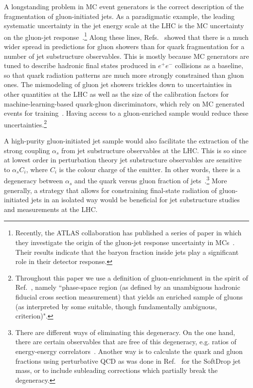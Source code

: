 \documentclass[a4paper,11pt]{article}
\begin{document}
A longstanding problem in MC event generators is the correct description of the fragmentation of gluon-initiated jets. As a paradigmatic example, the leading systematic uncertainty in the jet energy scale at the LHC is the MC uncertainty on the gluon-jet response~\cite{ATLAS:2020cli,CMS:2016lmd, CMS-DP-2020-019}.\footnote{Recently, the ATLAS collaboration has published a series of paper in which they investigate the origin of the gluon-jet response uncertainty in MCs~\cite{ATL-PHYS-PUB-2022-021,ATLAS:2024kkj, ATLAS:2024png}. Their results indicate that the baryon fraction inside jets play a significant role in their detector response.}  Along these lines, Refs.~\cite{Andersen:2016qtm, Gras:2017jty} showed that there is a much wider spread in predictions for gluon showers than for quark fragmentation for a number of jet substructure observables. This is mostly because MC generators are tuned to describe hadronic final states produced in $e^+e^-$ collisions as a baseline, so that quark radiation patterns are much more strongly constrained than gluon ones. The mismodeling of gluon jet showers trickles down to uncertainties in other quantities at the LHC as well as the size of the calibration factors for machine-learning-based quark-gluon discriminators, which rely on MC generated events for training~\cite{ATLAS:2014vax}. Having access to a gluon-enriched sample would reduce these uncertainties.\footnote{Throughout this paper we use a definition of gluon-enrichment in the spirit of Ref.~\cite{Andersen:2016qtm, Gras:2017jty}, namely ``phase-space region (as defined by an unambiguous hadronic fiducial cross section measurement) that yields an enriched sample of gluons (as interpreted by some suitable, though fundamentally ambiguous, criterion)".}

A high-purity gluon-initiated jet sample would also facilitate the extraction of the strong coupling $\alpha_s$ from jet substructure observables at the LHC. This is so since at lowest order in perturbation theory jet substructure observables are sensitive to $\alpha_s C_i$, where $C_i$ is the colour charge of the emitter. In other words, there is a degeneracy between $\alpha_s$ and the quark versus gluon fraction of jets~\cite{Proceedings:2018jsb}.\footnote{There are different ways of eliminating this degeneracy. On the one hand, there are certain observables that are free of this degeneracy, e.g. ratios of energy-energy correlators~\cite{Chen:2020vvp,CMS:2024mlf,Lee:2024esz}. Another way is to calculate the quark and gluon fractions using perturbative QCD as was done in Ref.~\cite{Hannesdottir:2022rsl} for the SoftDrop jet mass, or to include subleading corrections which partially break the degeneracy.} More generally, a strategy that allows for constraining final-state radiation of gluon-initiated jets in an isolated way would be beneficial for jet substructure studies and measurements at the LHC.
\end{document}
